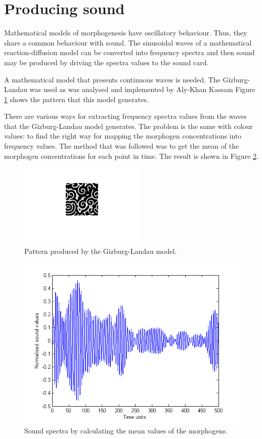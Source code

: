 	\section{Producing sound}
\label{glsound}
Mathematical models of morphogenesis have oscillatory behaviour. Thus, they share a common behaviour with sound. The sinusoidal waves of a mathematical reaction-diffusion model can be converted into frequency spectra and then sound may be produced by driving the spectra values to the sound card.

A mathematical model that presents continuous waves is needed. The Gizburg-Landau was used as was analysed and implemented by Aly-Khan Kassam \cite{kassam_solving_2003}
Figure \ref{gl}
shows the pattern that this model generates.    

There are various ways for extracting frequency spectra values from the waves that the Gizburg-Landau model generates. The problem is the same with colour values: to find the right way for mapping the morphogen concentrations into frequency values. The method that was followed was to get the mean of the morphogen concentrations for each point in time. The result is shown in Figure \ref{soundspectra}.


\begin{figure}
\centering
\includegraphics{gl.png}
\caption{Pattern produced by the Gizburg-Landau model.}
\label{gl}
\end{figure}

\begin{figure}
\centering
\includegraphics[scale=0.7]{sound_spectra.png}
\caption{Sound spectra by calculating the mean values of the morphogens.}
\label{soundspectra}
\end{figure}


